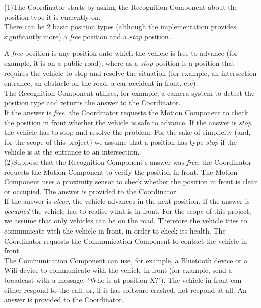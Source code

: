 \documentclass{memoir}
\begin{document}
(1)The Coordinator starts by asking the Recognition Component about the position type it is currently on. 
\\

There can be 2 basic position types (although the implementation provides significantly more) a \textit{free} position and a \textit{stop} position.

A \textit{free} position is any position onto which the vehicle is free to advance (for example, it is on a public road), where as a \textit{stop} position is a position that requires the vehicle to stop and resolve the situation (for example, an intersection entrance, an obstacle on the road, a 
car accident in front, etc).
\\

The Recognition Component utilises, for example, a camera system to detect the position type and returns the answer to the Coordinator.
\\

If the answer is \textit{free}, the Coordinator requests the Motion Component to check the position in front whether the vehicle is safe to advance.
If the answer is \textit{stop} the vehicle has to stop and resolve the problem. For the sake of simplicity (and, for the scope of this project) we assume that a position has type \textit{stop} if the vehicle is at the entrance to an intersection.
\\

 (2)Suppose that the Recognition Component's answer was \textit{free}, the Coordinator requests the Motion Component to verify the position in front. The Motion Component uses a proximity sensor to check whether the position in front is clear or occupied. The answer is provided to the Coordinator.
\\

If the answer is \textit{clear}, the vehicle advances in the next position. If the answer is \textit{occupied} the vehicle has to realise what is in front. For the scope of this project, we assume that only vehicles can be on the road. Therefore the vehicle tries to communicate with the vehicle in front, in order to check its health. The Coordinator requests the Communication Component to contact the vehicle in front.
\\

The Communication Component can use, for example, a Bluetooth device or a Wifi device to communicate with the vehicle in front (for example, send a broadcast with a message: "Who is at position X?"). The vehicle in front can either respond to the call, or, if it has software crashed, not respond at all. An answer is provided to the Coordinator.
\\
\end{document}
